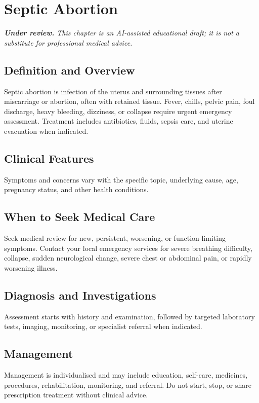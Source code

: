 \chapter{Septic Abortion}

\medskip
\noindent\textit{\textbf{Under review.} This chapter is an AI-assisted educational draft; it is not a substitute for professional medical advice.}

\section*{Definition and Overview}
Septic abortion is infection of the uterus and surrounding tissues after miscarriage or abortion, often with retained tissue. Fever, chills, pelvic pain, foul discharge, heavy bleeding, dizziness, or collapse require urgent emergency assessment. Treatment includes antibiotics, fluids, sepsis care, and uterine evacuation when indicated.

\section*{Clinical Features}
Symptoms and concerns vary with the specific topic, underlying cause, age, pregnancy status, and other health conditions.

\section*{When to Seek Medical Care}
Seek medical review for new, persistent, worsening, or function-limiting symptoms. Contact your local emergency services for severe breathing difficulty, collapse, sudden neurological change, severe chest or abdominal pain, or rapidly worsening illness.

\section*{Diagnosis and Investigations}
Assessment starts with history and examination, followed by targeted laboratory tests, imaging, monitoring, or specialist referral when indicated.

\section*{Management}
Management is individualised and may include education, self-care, medicines, procedures, rehabilitation, monitoring, and referral. Do not start, stop, or share prescription treatment without clinical advice.

